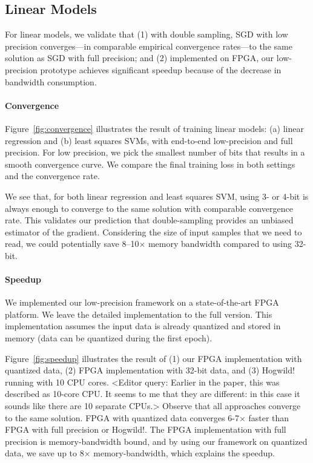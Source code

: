 \documentclass{article}
\begin{document}
\vspace{-1em}
\subsection{Linear Models}
\vspace{-0.5em}

For linear models, we validate that (1) 
with double sampling, SGD with low
precision converges---in
comparable empirical 
convergence rates---to the same solution
as SGD with full precision; and
(2) implemented on FPGA, our low-precision
prototype achieves significant speedup
because of the decrease in bandwidth
consumption.

\vspace{-1em}
\paragraph{Convergence}

Figure~\ref{fig:convergence} illustrates
the result of training linear models:
(a) linear
regression and (b) least squares SVMs,
with end-to-end low-precision and 
full precision. For
low precision, we pick the 
smallest number of bits that
results in a smooth convergence
curve. We compare the final 
training loss in both settings 
and the convergence rate.

\vspace{-0.5em}
We see that, for both linear regression 
and least squares SVM,
using 3- or 4-bit is always enough
to converge to the same solution
with comparable convergence rate. 
This validates our prediction that
double-sampling provides an
unbiased estimator of the gradient.
Considering the size of input
samples that we need to read, we
could potentially save 8--10$\times$ 
memory bandwidth compared to using 
32-bit. 

\vspace{-1em}
\paragraph{Speedup}
We implemented our low-precision 
framework on a state-of-the-art 
FPGA platform. We leave the detailed 
implementation to the full version.
This implementation assumes the input
data is already quantized and
stored in memory (data can be
quantized during the
first epoch).

\vspace{-0.5em}
Figure~\ref{fig:speedup} illustrates 
the result of (1) our FPGA
implementation with quantized data,
(2) FPGA implementation with 32-bit
data, and (3) Hogwild! running with
10 CPU cores. <Editor query: Earlier in the paper, this was described as 10-core CPU. It seems to me that they are different: in this case it sounds like there are 10 separate CPUs.>
Observe that all approaches
converge to the same solution.
FPGA with quantized data converges
6-7$\times$ faster
than FPGA with full precision
or Hogwild!. The FPGA implementation
with full precision is
memory-bandwidth bound, and by using our framework on quantized data, we save 
up to 8$\times$ memory-bandwidth, which
explains the speedup.
\end{document}
